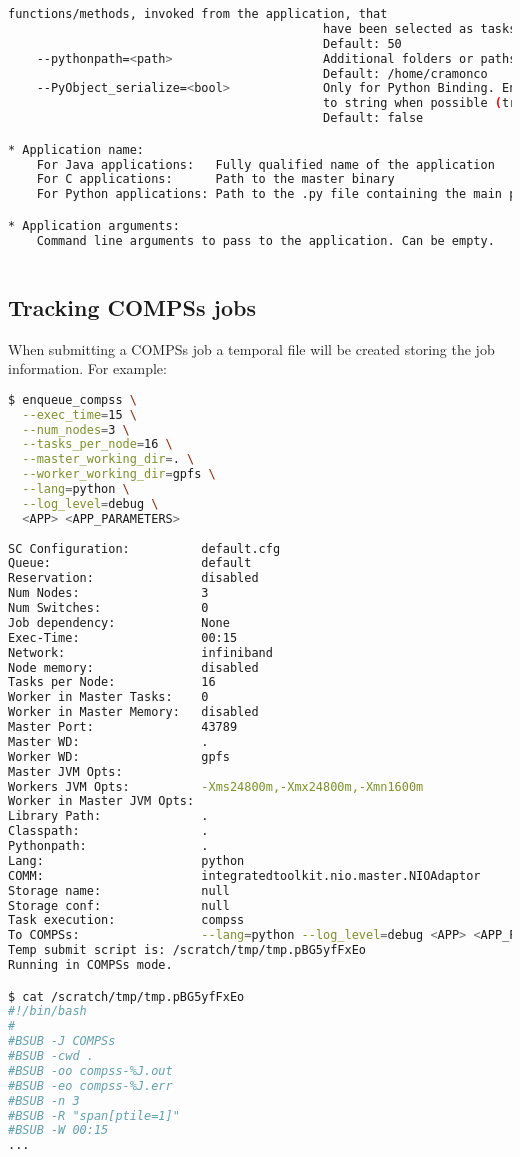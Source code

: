 \begin{lstlisting}[language=bash]
                                            functions/methods, invoked from the application, that 
                                            have been selected as tasks
                                            Default: 50
    --pythonpath=<path>                     Additional folders or paths to add to the PYTHONPATH
                                            Default: /home/cramonco
    --PyObject_serialize=<bool>             Only for Python Binding. Enable the object serialization
                                            to string when possible (true/false).
                                            Default: false

* Application name:
    For Java applications:   Fully qualified name of the application
    For C applications:      Path to the master binary
    For Python applications: Path to the .py file containing the main program

* Application arguments:
    Command line arguments to pass to the application. Can be empty.
  
\end{lstlisting}

\subsection{Tracking COMPSs jobs}
When submitting a COMPSs job a temporal file will be created storing the job information. For example:
\begin{lstlisting}[language=bash]
$ enqueue_compss \
  --exec_time=15 \
  --num_nodes=3 \
  --tasks_per_node=16 \
  --master_working_dir=. \
  --worker_working_dir=gpfs \
  --lang=python \
  --log_level=debug \
  <APP> <APP_PARAMETERS>
  
SC Configuration:          default.cfg
Queue:                     default
Reservation:               disabled
Num Nodes:                 3
Num Switches:              0
Job dependency:            None
Exec-Time:                 00:15
Network:                   infiniband
Node memory:               disabled
Tasks per Node:            16
Worker in Master Tasks:    0
Worker in Master Memory:   disabled
Master Port:               43789
Master WD:                 .
Worker WD:                 gpfs
Master JVM Opts:           
Workers JVM Opts:          -Xms24800m,-Xmx24800m,-Xmn1600m
Worker in Master JVM Opts: 
Library Path:              .
Classpath:                 .
Pythonpath:                .
Lang:                      python
COMM:                      integratedtoolkit.nio.master.NIOAdaptor
Storage name:              null
Storage conf:              null
Task execution:            compss
To COMPSs:                 --lang=python --log_level=debug <APP> <APP_PARAMETERS>
Temp submit script is: /scratch/tmp/tmp.pBG5yfFxEo
Running in COMPSs mode.

$ cat /scratch/tmp/tmp.pBG5yfFxEo
#!/bin/bash
#
#BSUB -J COMPSs
#BSUB -cwd . 
#BSUB -oo compss-%J.out
#BSUB -eo compss-%J.err
#BSUB -n 3
#BSUB -R "span[ptile=1]"
#BSUB -W 00:15 
...
\end{lstlisting}


